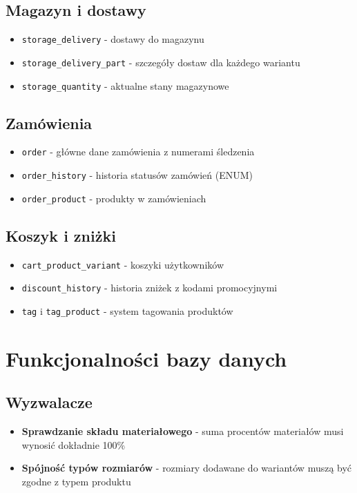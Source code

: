 \subsection*{Magazyn i dostawy}
\begin{itemize}
    \item \texttt{storage\_delivery} - dostawy do magazynu
    \item \texttt{storage\_delivery\_part} - szczegóły dostaw dla każdego wariantu
    \item \texttt{storage\_quantity} - aktualne stany magazynowe
\end{itemize}

\subsection*{Zamówienia}
\begin{itemize}
    \item \texttt{order} - główne dane zamówienia z numerami śledzenia
    \item \texttt{order\_history} - historia statusów zamówień (ENUM)
    \item \texttt{order\_product} - produkty w zamówieniach
\end{itemize}

\subsection*{Koszyk i zniżki}
\begin{itemize}
    \item \texttt{cart\_product\_variant} - koszyki użytkowników
    \item \texttt{discount\_history} - historia zniżek z kodami promocyjnymi
    \item \texttt{tag} i \texttt{tag\_product} - system tagowania produktów
\end{itemize}

\section*{Funkcjonalności bazy danych}

\subsection*{Wyzwalacze}
\begin{itemize}
    \item \textbf{Sprawdzanie składu materiałowego} - suma procentów materiałów musi wynosić dokładnie 100\%
    \item \textbf{Spójność typów rozmiarów} - rozmiary dodawane do wariantów muszą być zgodne z typem produktu
\end{itemize}

